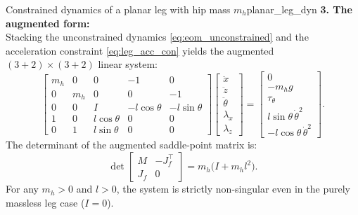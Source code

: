 \documentclass[11pt,a4paper]{article}
\begin{document}
\begin{example}{Constrained dynamics of a planar leg with hip mass $m_h$}{planar_leg_dyn}
\textbf{3. The augmented form:}\\
Stacking the unconstrained dynamics \eqref{eq:eom_unconstrained} and the acceleration constraint \eqref{eq:leg_acc_con} yields the augmented $(3+2) \times (3+2)$ linear system:
\begin{equation}\label{eq:leg_augmented_kkt}
\begin{bmatrix}
  m_h & 0 & 0 & -1 & 0 \\
  0 & m_h & 0 & 0 & -1 \\
  0 & 0 & I & -l\cos\theta & -l\sin\theta \\
  1 & 0 & l\cos\theta & 0 & 0 \\
  0 & 1 & l\sin\theta & 0 & 0
\end{bmatrix}
\begin{bmatrix}
  \ddot x \\ \ddot z \\ \ddot\theta \\ \lambda_x \\ \lambda_z
\end{bmatrix}
=
\begin{bmatrix}
  0 \\ -m_h g \\ \tau_\theta \\ l\sin\theta\,\dot\theta^2 \\ -l\cos\theta\,\dot\theta^2
\end{bmatrix}.
\end{equation}
The determinant of the augmented saddle-point matrix is:
\begin{equation}
  \det \begin{bmatrix} M & -J_f^\top \\ J_f & 0 \end{bmatrix} = m_h\big(I + m_h l^2\big).
\end{equation}
For any $m_h > 0$ and $l > 0$, the system is strictly non-singular even in the purely massless leg case ($I = 0$).


\end{example}
\end{document}
